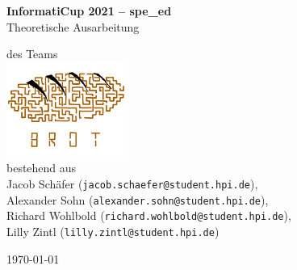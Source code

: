 \documentclass[12pt,a4paper]{article}
\newcommand{\HRule}{\rule{\linewidth}{0.5mm}}
\begin{document}
\begin{titlepage}
\begin{center}



\vspace*{2cm}
{ \LARGE 
  \textbf{InformatiCup 2021 -- spe\_ed}\\[0.4cm]
  Theoretische Ausarbeitung\\
}
\vspace*{3cm}

{ \large
  des Teams \\[0.5cm]
  \includegraphics[width=0.3\textwidth]{brot_logo.jpg}~\\
  bestehend aus \\[3cm]
  Jacob Schäfer (\texttt{jacob.schaefer@student.hpi.de}), \\
  Alexander Sohn (\texttt{alexander.sohn@student.hpi.de}), \\
  Richard Wohlbold (\texttt{richard.wohlbold@student.hpi.de}), \\
  Lilly Zintl (\texttt{lilly.zintl@student.hpi.de}) \\
}
\vfill



{\large \today}
 
\end{center}
\end{titlepage}


\newpage



\tableofcontents
\thispagestyle{empty}
\newpage
\end{document}
